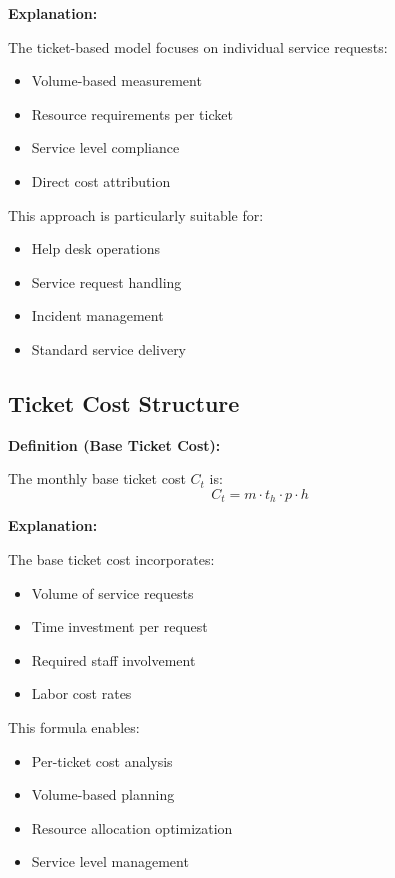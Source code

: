 \documentclass[12pt,a4paper]{article}
\newenvironment{definition}[1]
{\begin{mdframed}[style=definitionstyle]
\textbf{Definition (#1):}\par}
{\end{mdframed}}
\newenvironment{explanation}
{\begin{mdframed}[style=explanationstyle]
\textbf{Explanation:}\par}
{\end{mdframed}}
\begin{document}
\begin{explanation}
The ticket-based model focuses on individual service requests:
\begin{itemize}
    \item Volume-based measurement
    \item Resource requirements per ticket
    \item Service level compliance
    \item Direct cost attribution
\end{itemize}

This approach is particularly suitable for:
\begin{itemize}
    \item Help desk operations
    \item Service request handling
    \item Incident management
    \item Standard service delivery
\end{itemize}
\end{explanation}

\subsection{Ticket Cost Structure}
\begin{definition}{Base Ticket Cost}
The monthly base ticket cost $C_t$ is:
\begin{equation}
    C_t = m \cdot t_h \cdot p \cdot h
\end{equation}
\end{definition}

\begin{explanation}
The base ticket cost incorporates:
\begin{itemize}
    \item Volume of service requests
    \item Time investment per request
    \item Required staff involvement
    \item Labor cost rates
\end{itemize}

This formula enables:
\begin{itemize}
    \item Per-ticket cost analysis
    \item Volume-based planning
    \item Resource allocation optimization
    \item Service level management
\end{itemize}
\end{explanation}
\end{document}
